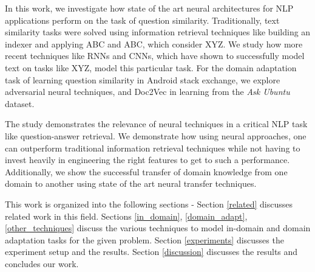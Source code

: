 \documentclass{sigkddExp}
\begin{document}
In this work, we investigate how state of the art neural architectures for NLP applications perform on the task of question similarity. Traditionally, text similarity tasks were solved using information retrieval techniques like building an indexer and applying ABC and ABC, which consider XYZ. We study how more recent techniques like RNNs and CNNs, which have shown to successfully model text on tasks like XYZ, model this particular task. For the domain adaptation task of learning question similarity in {Android stack exchange}, we explore adversarial neural techniques, and Doc2Vec \cite{REF} in learning from the \textit{Ask Ubuntu} dataset. 

The study demonstrates the relevance of neural techniques in a critical NLP task like question-answer retrieval. We demonstrate how using neural approaches, one can outperform traditional information retrieval techniques while not having to invest heavily in engineering the right features to get to such a performance. Additionally, we show the successful transfer of domain knowledge from one domain to another using state of the art neural transfer techniques.

This work is organized into the following sections - Section \ref{related} discusses related work in this field. Sections \ref{in_domain}, \ref{domain_adapt},  \ref{other_techniques} discuss the various techniques to model in-domain and domain adaptation tasks for the given problem. Section \ref{experiments} discusses the experiment setup and the results. Section \ref{discussion} discusses the results and concludes our work.
\end{document}
